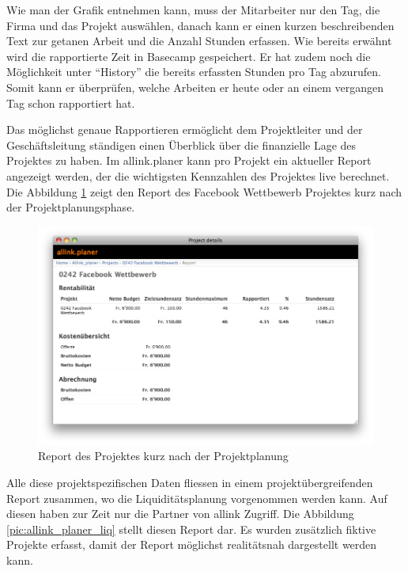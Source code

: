 Wie man der Grafik entnehmen kann, muss der Mitarbeiter nur den Tag, die Firma
und das Projekt auswählen, danach kann er einen kurzen beschreibenden Text
zur getanen Arbeit und die Anzahl Stunden erfassen. Wie bereits erwähnt wird
die rapportierte Zeit in Basecamp gespeichert. Er hat zudem noch die Möglichkeit 
unter ``History'' die bereits erfassten Stunden pro Tag abzurufen. Somit kann 
er überprüfen, welche Arbeiten er heute oder an einem vergangen Tag schon rapportiert 
hat.

Das möglichst genaue Rapportieren ermöglicht dem Projektleiter und der Geschäftsleitung
ständigen einen Überblick über die finanzielle Lage des Projektes zu haben.
Im allink.planer kann pro Projekt ein aktueller Report angezeigt werden, der
die wichtigsten Kennzahlen des Projektes live berechnet. Die Abbildung \ref{pic:allink_planer_report}
zeigt den Report des Facebook Wettbewerb Projektes kurz nach der Projektplanungsphase.

\begin{figure}[htbp]
\begin{center}
\includegraphics[width=1.0\textwidth,angle=0]{./bilder/proof_of_concept/allink_planer_report.png}
\caption[Report des Projektes kurz nach der Projektplanung]{Report des Projektes 
    kurz nach der Projektplanung\footnotemark}
\label{pic:allink_planer_report}
\end{center}
\end{figure}

\clearpage

Alle diese projektspezifischen Daten fliessen in einem projektübergreifenden
Report zusammen, wo die Liquiditätsplanung vorgenommen werden kann. Auf diesen
haben zur Zeit nur die Partner von allink Zugriff. Die Abbildung \ref{pic:allink_planer_liq} stellt
diesen Report dar. Es wurden zusätzlich fiktive Projekte erfasst, damit der
Report möglichst realitätsnah dargestellt werden kann.

